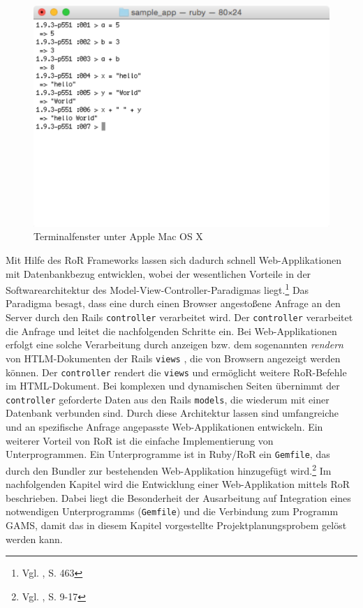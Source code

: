\documentclass[a4paper,12pt,parskip,bibtotoc,liststotoc]{article}
\begin{document}
\begin{figure}[h!]
  \begin{center}
    \includegraphics[width=120mm]{Bilder/Terminal.pdf}
    \caption{Terminalfenster unter Apple Mac OS X}  \label{Terminal}
  \end{center}
\end{figure}

Mit Hilfe des RoR Frameworks lassen sich dadurch schnell Web-Applikationen mit Datenbankbezug entwicklen, wobei der wesentlichen Vorteile in der Softwarearchitektur des Model-View-Controller-Paradigmas liegt.\footnote{Vgl. \cite{walter2008ruby}, S. 463} Das Paradigma besagt, dass eine durch einen Browser angestoßene Anfrage an den Server durch den Rails \texttt{controller} verarbeitet wird. Der \texttt{controller} verarbeitet die Anfrage und leitet die nachfolgenden Schritte ein. Bei Web-Applikationen erfolgt eine solche Verarbeitung durch anzeigen bzw. dem sogenannten \textit{rendern} von HTLM-Dokumenten der Rails \texttt{views} , die von Browsern angezeigt werden können. Der \texttt{controller} rendert die \texttt{views} und ermöglicht weitere RoR-Befehle im HTML-Dokument. Bei komplexen und dynamischen Seiten übernimmt der \texttt{controller} geforderte Daten aus den Rails \texttt{models}, die wiederum mit einer Datenbank verbunden sind. Durch diese Architektur lassen sind umfangreiche und an spezifische Anfrage angepasste Web-Applikationen entwickeln. Ein weiterer Vorteil von RoR ist die einfache Implementierung von Unterprogrammen. Ein Unterprogramme ist in Ruby/RoR ein \texttt{Gemfile}, das durch den Bundler zur bestehenden Web-Applikation hinzugefügt wird.\footnote{Vgl. \cite{hartl2012ruby}, S. 9-17} Im nachfolgenden Kapitel wird die Entwicklung einer Web-Applikation mittels RoR beschrieben. Dabei liegt die Besonderheit der Ausarbeitung auf Integration eines notwendigen Unterprogramms (\texttt{Gemfile}) und die Verbindung zum Programm GAMS, damit das in diesem Kapitel vorgestellte Projektplanungsprobem gelöst werden kann.
\end{document}

